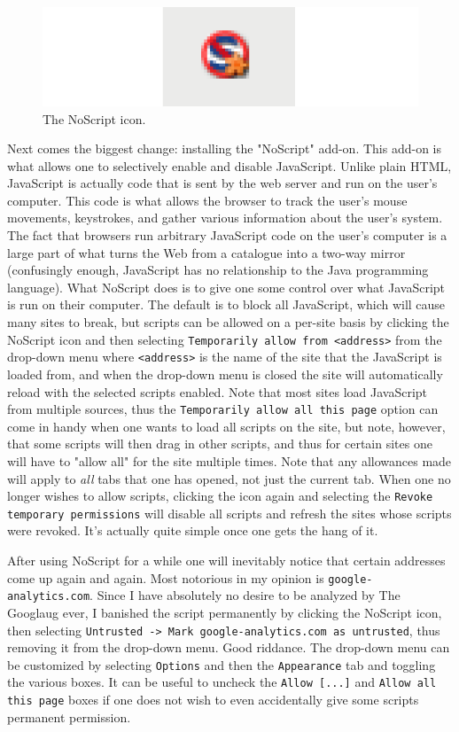 \documentclass{article}
\begin{document}
\begin{figure}
\includegraphics[scale=0.5]{files/blog/2018_01_17_better_browsing_with_firefox/2018_01_17_noscript_icon.png}
\caption{The NoScript icon.}
\end{figure}
Next comes the biggest change: installing the "NoScript" add-on.  This add-on is what allows one to selectively enable and disable JavaScript.  Unlike plain HTML, JavaScript is actually code that is sent by the web server and run on the user's computer.  This code is what allows the browser to track the user's mouse movements, keystrokes, and gather various information about the user's system.  The fact that browsers run arbitrary JavaScript code on the user's computer is a large part of what turns the Web from a catalogue into a two-way mirror (confusingly enough, JavaScript has no relationship to the Java programming language).  What NoScript does is to give one some control over what JavaScript is run on their computer.  The default is to block all JavaScript, which will cause many sites to break, but scripts can be allowed on a per-site basis by clicking the NoScript icon and then selecting \texttt{Temporarily allow from <address>} from the drop-down menu where \texttt{<address>} is the name of the site that the JavaScript is loaded from, and when the drop-down menu is closed the site will automatically reload with the selected scripts enabled.  Note that most sites load JavaScript from multiple sources, thus the \texttt{Temporarily allow all this page} option can come in handy when one wants to load all scripts on the site, but note, however, that some scripts will then drag in other scripts, and thus for certain sites one will have to "allow all" for the site multiple times.  Note that any allowances made will apply to \textit{all} tabs that one has opened, not just the current tab.  When one no longer wishes to allow scripts, clicking the icon again and selecting the \texttt{Revoke temporary permissions} will disable all scripts and refresh the sites whose scripts were revoked.  It's actually quite simple once one gets the hang of it.

After using NoScript for a while one will inevitably notice that certain addresses come up again and again.  Most notorious in my opinion is \texttt{google-analytics.com}.  Since I have absolutely no desire to be analyzed by The Googlaug ever, I banished the script permanently by clicking the NoScript icon, then selecting \texttt{Untrusted -> Mark google-analytics.com as untrusted}, thus removing it from the drop-down menu.  Good riddance.  The drop-down menu can be customized by selecting \texttt{Options} and then the \texttt{Appearance} tab and toggling the various boxes.  It can be useful to uncheck the \texttt{Allow [...]} and \texttt{Allow all this page} boxes if one does not wish to even accidentally give some scripts permanent permission.
\end{document}
